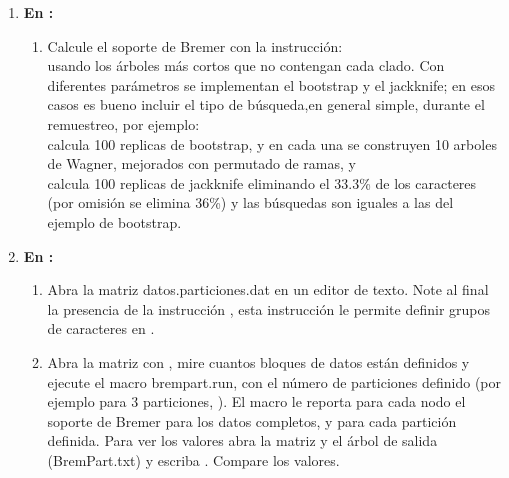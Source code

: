 \begin{enumerate}
\item \textbf{En :}
	\begin{enumerate}
		\item Calcule el soporte de Bremer con la instrucci\'on:
		\\ 
		usando los \'arboles m\'as cortos que no contengan cada clado. Con diferentes par\'ametros se implementan el bootstrap y el jackknife; en esos casos es bueno incluir el tipo de b\'usqueda,en general simple, durante el remuestreo, por ejemplo: 
		\\ 
		calcula 100 replicas de bootstrap, y en cada una se construyen 10 arboles de Wagner, mejorados con permutado de ramas, y 
		\\
		calcula 100 replicas de jackknife eliminando el 33.3\% de los caracteres (por omisi\'on se elimina 36\%) y las b\'usquedas son iguales a las del ejemplo de bootstrap.
		\end{enumerate}


\item \textbf{En :}
	\begin{enumerate}
	\item Abra la matriz datos.particiones.dat en un editor de texto. Note al final la presencia de la instrucci\'on , esta instrucci\'on le permite definir grupos de caracteres en .\\
	\item Abra la matriz con , mire cuantos bloques de datos est\'an definidos y ejecute el macro brempart.run, con el n\'umero de particiones definido (por ejemplo para 3 particiones, ). El macro le reporta para cada nodo el soporte de Bremer para los datos completos, y para cada partici\'on definida. Para ver los valores abra la matriz y el \'arbol de salida (BremPart.txt) y escriba . Compare los valores.
	\end{enumerate}



\end{enumerate}
